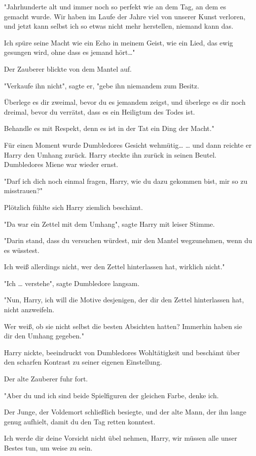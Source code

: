 {"Jahrhunderte alt und immer noch so perfekt wie an dem Tag, an dem es gemacht wurde. Wir haben im Laufe der Jahre viel von unserer Kunst verloren, und jetzt kann selbst ich so etwas nicht mehr herstellen, niemand kann das.

Ich spüre seine Macht wie ein Echo in meinem Geist, wie ein Lied, das ewig gesungen wird, ohne dass es jemand hört…"

Der Zauberer blickte von dem Mantel auf.

"Verkaufe ihn nicht", sagte er, "gebe ihn niemandem zum Besitz.

Überlege es dir zweimal, bevor du es jemandem zeigst, und überlege es dir noch dreimal, bevor du verrätst, dass es ein Heiligtum des Todes ist.

Behandle es mit Respekt, denn es ist in der Tat ein Ding der Macht."

Für einen Moment wurde Dumbledores Gesicht wehmütig… … und dann reichte er Harry den Umhang zurück. Harry steckte ihn zurück in seinen Beutel. Dumbledores Miene war wieder ernst.

"Darf ich dich noch einmal fragen, Harry, wie du dazu gekommen bist, mir so zu misstrauen?"

Plötzlich fühlte sich Harry ziemlich beschämt.

"Da war ein Zettel mit dem Umhang", sagte Harry mit leiser Stimme.

"Darin stand, dass du versuchen würdest, mir den Mantel wegzunehmen, wenn du es wüsstest.

Ich weiß allerdings nicht, wer den Zettel hinterlassen hat, wirklich nicht."

"Ich … verstehe", sagte Dumbledore langsam.

"Nun, Harry, ich will die Motive desjenigen, der dir den Zettel hinterlassen hat, nicht anzweifeln.

Wer weiß, ob sie nicht selbst die besten Absichten hatten? Immerhin haben sie dir den Umhang gegeben."

Harry nickte, beeindruckt von Dumbledores Wohltätigkeit und beschämt über den scharfen Kontrast zu seiner eigenen Einstellung.

Der alte Zauberer fuhr fort.

"Aber du und ich sind beide Spielfiguren der gleichen Farbe, denke ich.

Der Junge, der Voldemort schließlich besiegte, und der alte Mann, der ihn lange genug aufhielt, damit du den Tag retten konntest.

Ich werde dir deine Vorsicht nicht übel nehmen, Harry, wir müssen alle unser Bestes tun, um weise zu sein.

}
